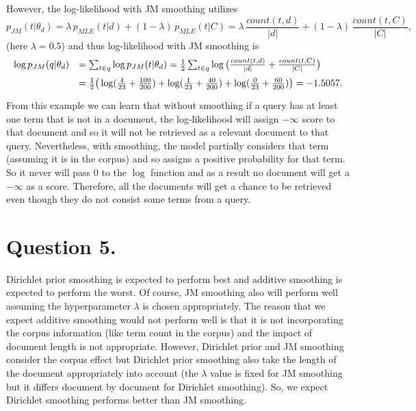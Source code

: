 \documentclass[11pt]{article}
\begin{document}
However, the log-likelihood with JM smoothing utilizes 
$$p_{JM}(t| \theta_d) = \lambda \, p_{MLE}(t| d) + (1- \lambda) \, p_{MLE}(t | C) = \lambda \, \frac{count(t, d)}{|d|} + (1 - \lambda) \, \frac{count(t, C)}{|C|},$$ 
(here $\lambda = 0.5$) and thus log-likelihood with JM smoothing is 
$$\begin{array}{ll} \vspace{2mm}
\log p_{JM}(q| \theta_d) & = \sum_{t \in q} \log p_{JM}(t| \theta_d) = \frac{1}{2} \sum_{t \in q}  \log\big(\frac{count(t, d)}{|d|} + \frac{count(t, C)}{|C|}\big) \\ \vspace{1mm} &
=\frac{1}{2} \big(\log(\frac{4}{23} + \frac{100}{200}) + \log(\frac{1}{23} + \frac{40}{200}) + \log(\frac{0}{23} + \frac{60}{200}) \big) = -1.5057.
\end{array}$$
From this example we can learn that without smoothing if a query has at least one term that is not in a document, the log-likelihood will assign $-\infty$ score to that document and so it will not be retrieved as a relevant document to that query. Nevertheless, with smoothing, the model partially considers that term (assuming it is in the corpus) and so assigns a positive probability for that term. So it never will pass 0 to the $\log$ function and as a result no document will get a $-\infty$ as a score. Therefore, all the documents will get a chance to be retrieved even though they do not consist some terms from a query. 



\section*{Question 5.}%
Dirichlet prior smoothing is expected to perform best and additive smoothing is expected to perform the worst. Of course, JM smoothing also will perform well assuming the hyperparameter $\lambda$ is chosen appropriately. The reason that we expect additive smoothing would not perform well is that it is not incorporating the corpus information (like term count in the corpus) and the impact of document length is not appropriate. However, Dirichlet prior and JM smoothing consider the corpus effect but Dirichlet prior smoothing also take the length of the document appropriately into account (the $\lambda$ value is fixed for JM smoothing but it differs document by document for Dirichlet smoothing). So, we expect Dirichlet smoothing performs better than JM smoothing. 
\end{document}
